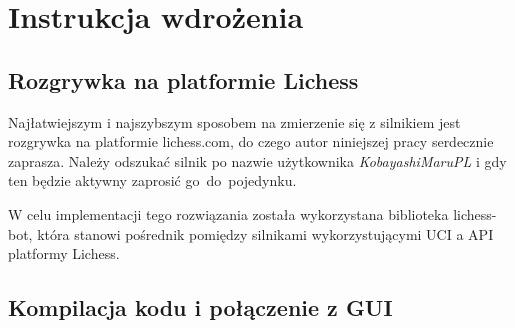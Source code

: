 \chapter{Instrukcja wdrożenia}
\label{ch:instrukcja-wdrozenia}

\section{Rozgrywka na platformie Lichess}
\label{sec:rozgrywka-na-platformie-lichess}
Najłatwiejszym i najszybszym sposobem na zmierzenie się z silnikiem jest rozgrywka na platformie lichess.com, do czego autor niniejszej pracy serdecznie zaprasza.
Należy odszukać silnik po nazwie użytkownika \textit{KobayashiMaruPL} i gdy ten będzie aktywny zaprosić go~do~pojedynku.

W celu implementacji tego rozwiązania została wykorzystana biblioteka lichess-bot, która stanowi pośrednik pomiędzy silnikami wykorzystującymi UCI a API platformy Lichess. \cite{lichess-bot}

\section{Kompilacja kodu i połączenie z GUI}
\label{sec:kompilacja-kodu-i-polaczenie-z-gui}

